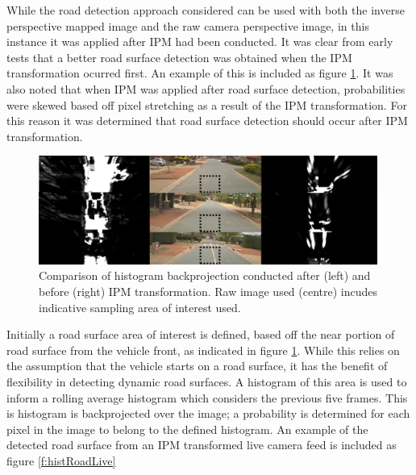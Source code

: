 \documentclass[]{aiaa-tc}%
\begin{document}
While the road detection approach considered can be used with both the inverse perspective mapped image and the raw camera perspective image, in this instance it was applied after IPM had been conducted. It was clear from early tests that a better road surface detection was obtained when the IPM transformation ocurred first. An example of this is included as figure \ref{f:histIPMcompare}. It was also noted that when IPM was applied after road surface detection, probabilities were skewed based off pixel stretching as a result of the IPM transformation. For this reason it was determined that road surface detection should occur after IPM transformation.

\begin{figure}
	\includegraphics[width=0.99\textwidth]{RoadDetection/histIPMcompare.png}
	\caption{Comparison of histogram backprojection conducted after (left) and before (right) IPM transformation. Raw image used (centre) incudes indicative sampling area of interest used.}
	\label{f:histIPMcompare}
\end{figure}

Initially a road surface area of interest is defined, based off the near portion of road surface from the vehicle front, as indicated in figure \ref{f:histIPMcompare}. While this relies on the assumption that the vehicle starts on a road surface, it has the benefit of flexibility in detecting dynamic road surfaces. A histogram of this area is used to inform a rolling average histogram which considers the previous five frames. This is histogram is backprojected over the image; a probability is determined for each pixel in the image to belong to the defined histogram. An example of the detected road surface from an IPM transformed live camera feed is included as figure \ref{f:histRoadLive}

\end{document}
